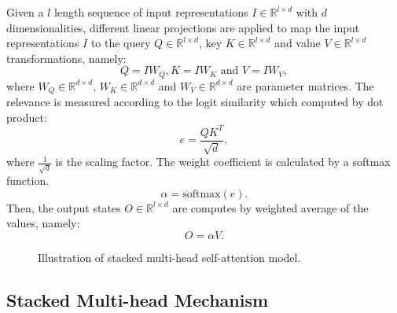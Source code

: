 \documentclass[11pt,a4paper]{article}
\begin{document}
\iffalse


\pagebreak
Given a $l$ length sequence of input representations $I\in\mathbb{R}^{l\times d}$ with $d$ dimensionalities, different linear projections are applied to map the input representations $I$ to the query $Q\in\mathbb{R}^{l\times d}$, key $K\in\mathbb{R}^{l\times d}$ and value $V\in\mathbb{R}^{l\times d}$ transformations, namely:
\begin{equation*}
    Q = IW_Q, K = IW_K \text{ and } V = IW_V,
\end{equation*}
where $W_Q\in\mathbb{R}^{d\times d}$, $W_K\in\mathbb{R}^{d\times d}$ and $W_V\in\mathbb{R}^{d\times d}$ are parameter matrices. The relevance is measured according to the logit similarity which computed by dot product:
\begin{equation}
\label{eq:sim}
e = \frac{Q{K}^T}{\sqrt{d}},
\end{equation}
where $\frac{1}{\sqrt{d}}$ is the scaling factor. The weight coefficient is calculated by a softmax function.
\begin{equation}
    \alpha = \text{softmax}(e).
    \label{eq:softmax}
\end{equation}
Then, the output states $O \in\mathbb{R}^{l\times d}$ are computes by weighted average of the values, namely: \begin{equation}
    \label{eq:out}
    O = \alpha V.
\end{equation}

\begin{figure}[t]
    \centering
\caption{    
\label{fig:stacked}
Illustration of stacked multi-head self-attention model.
}
\end{figure}
\subsection{Stacked Multi-head Mechanism}
\end{document}
